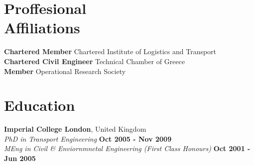 \documentclass[margin]{res}
\begin{document}
\begin{resume}
\vspace{-0.20in}
\section{\sc Proffesional\\ Affiliations}
    {\bf Chartered Member} Chartered Institute of Logistics and Transport\\
    {\bf Chartered Civil Engineer} Technical Chamber of Greece\\
    {\bf Member} Operational Research Society\\

\vspace{-0.20in}
\section{\sc Education}
{\bf Imperial College London}, United Kingdom\\
\textit{PhD in Transport Engineering} \hfill {\bf Oct 2005 - Nov 2009}\\
\textit{MEng in Civil \& Enviornmnetal Engineering (First Class Honours)} \hfill {\bf Oct 2001 - Jun 2005}\\

\vspace{-0.1in}

\end{resume}
\end{document}
